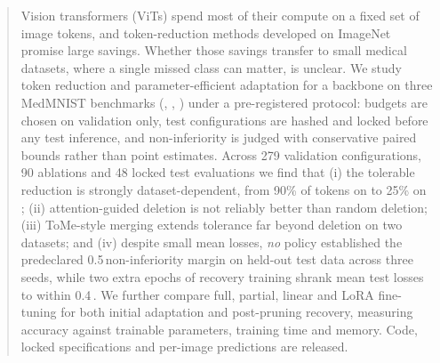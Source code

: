 \begin{abstract}
Vision transformers (ViTs) spend most of their compute on a fixed set of image tokens, and token-reduction methods developed on ImageNet promise large savings. Whether those savings transfer to small medical datasets, where a single missed class can matter, is unclear. We study token reduction and parameter-efficient adaptation for a \deit backbone on three MedMNIST benchmarks (\pathmnist, \dermamnist, \pneumnist) under a pre-registered protocol: budgets are chosen on validation only, test configurations are hashed and locked before any test inference, and non-inferiority is judged with conservative paired bounds rather than point estimates. Across 279 validation configurations, 90 ablations and 48 locked test evaluations we find that (i) the tolerable reduction is strongly dataset-dependent, from 90\% of tokens on \pathmnist to 25\% on \dermamnist; (ii) attention-guided deletion is not reliably better than random deletion; (iii) ToMe-style merging extends tolerance far beyond deletion on two datasets; and (iv) despite small mean losses, \emph{no} policy established the predeclared 0.5\,\pp non-inferiority margin on held-out test data across three seeds, while two extra epochs of recovery training shrank mean test losses to within 0.4\,\pp. We further compare full, partial, linear and LoRA fine-tuning for both initial adaptation and post-pruning recovery, measuring accuracy against trainable parameters, training time and memory.  Code, locked specifications and per-image predictions are released.
\end{abstract}
